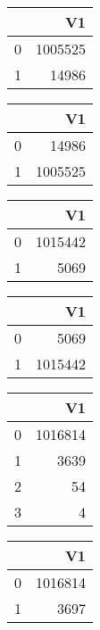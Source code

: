 \bigskip\bigskip
\centering
\begin{tabular}{rr}
  \hline
 & V1 \\ 
  \hline
0 & 1005525 \\ 
  1 & 14986 \\ 
   \hline
\end{tabular}

\bigskip\bigskip
\centering
\begin{tabular}{rr}
  \hline
 & V1 \\ 
  \hline
0 & 14986 \\ 
  1 & 1005525 \\ 
   \hline
\end{tabular}

\bigskip\bigskip
\centering
\begin{tabular}{rr}
  \hline
 & V1 \\ 
  \hline
0 & 1015442 \\ 
  1 & 5069 \\ 
   \hline
\end{tabular}

\bigskip\bigskip
\centering
\begin{tabular}{rr}
  \hline
 & V1 \\ 
  \hline
0 & 5069 \\ 
  1 & 1015442 \\ 
   \hline
\end{tabular}

\bigskip\bigskip
\centering
\begin{tabular}{rr}
  \hline
 & V1 \\ 
  \hline
0 & 1016814 \\ 
  1 & 3639 \\ 
  2 &  54 \\ 
  3 &   4 \\ 
   \hline
\end{tabular}

\bigskip\bigskip
\centering
\begin{tabular}{rr}
  \hline
 & V1 \\ 
  \hline
0 & 1016814 \\ 
  1 & 3697 \\ 
   \hline
\end{tabular}

